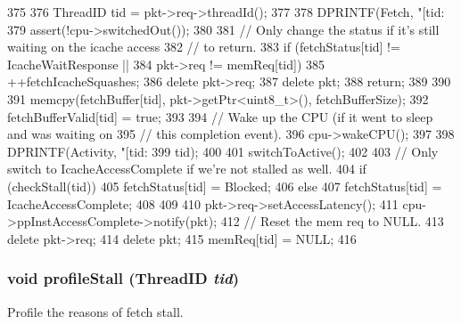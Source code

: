 \begin{DoxyCode}
375 {
376     ThreadID tid = pkt->req->threadId();
377 
378     DPRINTF(Fetch, "[tid:%
379     assert(!cpu->switchedOut());
380 
381     // Only change the status if it's still waiting on the icache access
382     // to return.
383     if (fetchStatus[tid] != IcacheWaitResponse ||
384         pkt->req != memReq[tid]) {
385         ++fetchIcacheSquashes;
386         delete pkt->req;
387         delete pkt;
388         return;
389     }
390 
391     memcpy(fetchBuffer[tid], pkt->getPtr<uint8_t>(), fetchBufferSize);
392     fetchBufferValid[tid] = true;
393 
394     // Wake up the CPU (if it went to sleep and was waiting on
395     // this completion event).
396     cpu->wakeCPU();
397 
398     DPRINTF(Activity, "[tid:%
399             tid);
400 
401     switchToActive();
402 
403     // Only switch to IcacheAccessComplete if we're not stalled as well.
404     if (checkStall(tid)) {
405         fetchStatus[tid] = Blocked;
406     } else {
407         fetchStatus[tid] = IcacheAccessComplete;
408     }
409 
410     pkt->req->setAccessLatency();
411     cpu->ppInstAccessComplete->notify(pkt);
412     // Reset the mem req to NULL.
413     delete pkt->req;
414     delete pkt;
415     memReq[tid] = NULL;
416 }
\end{DoxyCode}
\hypertarget{classDefaultFetch_ab3fa3c541f25b65e1b61d7290712e507}{
\subsubsection[{profileStall}]{\setlength{\rightskip}{0pt plus 5cm}void profileStall ({\bf ThreadID} {\em tid})}}
\label{classDefaultFetch_ab3fa3c541f25b65e1b61d7290712e507}
Profile the reasons of fetch stall. 


